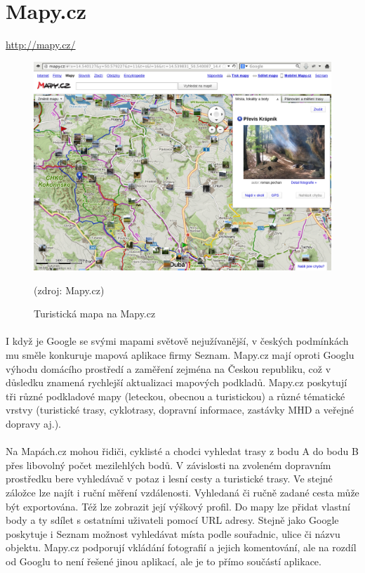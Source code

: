 \documentclass[11pt,a4paper,titlepage,oneside]{book}
\begin{document}
\newpage
	\section{Mapy.cz}
		\url{http://mapy.cz/}
			\begin{figure}[!h]
				\begin{center}
					\includegraphics[width=12cm]{obrazky/mapycz.png}
					\caption{Turistická mapa na Mapy.cz}
					(zdroj: Mapy.cz\cite{seznamMapa})
				\end{center}
			\end{figure}

		\paragraph{} I když je Google se svými mapami světově nejužívanější, v českých pod\-mínkách mu směle konkuruje mapová aplikace firmy Seznam. Mapy.cz mají oproti Googlu výhodu domácího prostředí a zaměření zejména na Českou republiku, což v důsledku znamená rychlejší aktualizaci mapových podkladů. Mapy.cz poskytují tři různé podkladové mapy (leteckou, obecnou a turistickou) a různé tématické vrstvy (turistické trasy, cyklotrasy, dopravní informace, zastávky MHD a veřejné dopravy aj.). 
		\paragraph{} Na Mapách.cz mohou řidiči, cyklisté a chodci vyhledat trasy z bodu A do bodu B přes libovolný počet mezilehlých bodů. V závislosti na zvoleném dopravním prostředku bere vyhledávač v potaz i lesní cesty a turistické trasy. Ve stejné záložce lze najít i ruční měření vzdálenosti. Vyhledaná či ručně zadané cesta může být exportována. Též lze zobrazit její výškový profil. Do mapy lze přidat vlastní body a ty sdílet s ostatními uživateli pomocí URL adresy. Stejně jako Google poskytuje i Seznam možnost vyhledávat místa podle souřadnic, ulice či názvu objektu. Mapy.cz podporují vkládání fotografií a jejich komentování, ale na rozdíl od Googlu to není řešené jinou aplikací, ale je to přímo součástí aplikace.
\end{document}
